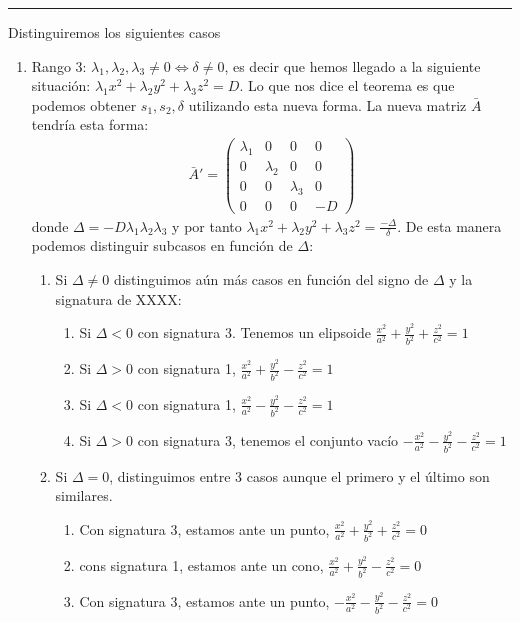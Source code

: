 \documentclass[14pt]{book}
\begin{document}
\hrule
Distinguiremos los siguientes casos
\begin{enumerate}
	\item Rango 3: $\lambda_1, \lambda_2, \lambda_3 ≠ 0 \iff \delta ≠ 0$, es decir que hemos llegado a la siguiente situación: $\lambda_1 x^2 + \lambda_2 y^2 + \lambda_3 z^2 = D$. Lo que nos dice el teorema es que podemos obtener $s_1, s_2, \delta$ utilizando esta nueva forma. La nueva matriz $\bar{A}$ tendría esta forma:
	\begin{align*}
		\bar{A}' = \left(\begin{array}{cccc}
		\lambda_1 &0 & 0 & 0 \\
		0 & \lambda_2 & 0 & 0 \\
		0 & 0 & \lambda_3 & 0 \\
		0 & 0 & 0 & -D
		\end{array}\right)
	\end{align*}
	donde $\Delta = -D\lambda_1\lambda_2\lambda_3$ y por tanto $\lambda_1x^2 + \lambda_2y^2 + \lambda_3z^2 = \frac{-\Delta}{\delta}$. De esta manera podemos distinguir subcasos en función de $\Delta$:
	\begin{enumerate}
		\item Si $\Delta ≠ 0$ distinguimos aún más casos en función del signo de $\Delta$ y la signatura de XXXX:
		\begin{enumerate}
			\item Si $\Delta < 0$ con signatura 3. Tenemos un elipsoide $\frac{x^2}{a^2} + \frac{y^2}{b^2} + \frac{z^2}{c^2} = 1$
			\item Si $\Delta > 0$ con signatura 1, $\frac{x^2}{a^2} + \frac{y^2}{b^2} - \frac{z^2}{c^2} = 1$
			\item Si $\Delta < 0$ con signatura 1, $\frac{x^2}{a^2} - \frac{y^2}{b^2} - \frac{z^2}{c^2} = 1$
			\item Si $\Delta > 0$  con signatura 3, tenemos el conjunto vacío $-\frac{x^2}{a^2} - \frac{y^2}{b^2} - \frac{z^2}{c^2} = 1$
		\end{enumerate}
		\item Si $\Delta = 0$, distinguimos entre 3 casos aunque el primero y el último son similares.
		\begin{enumerate}
			\item Con signatura 3, estamos ante un punto, $\frac{x^2}{a^2} + \frac{y^2}{b^2} + \frac{z^2}{c^2} = 0$
			\item cons signatura 1, estamos ante un cono, $\frac{x^2}{a^2} + \frac{y^2}{b^2} - \frac{z^2}{c^2} = 0$
			\item Con signatura 3, estamos ante un punto, $-\frac{x^2}{a^2} - \frac{y^2}{b^2} - \frac{z^2}{c^2} = 0$

\end{enumerate}
\end{enumerate}
\end{enumerate}
\end{document}
